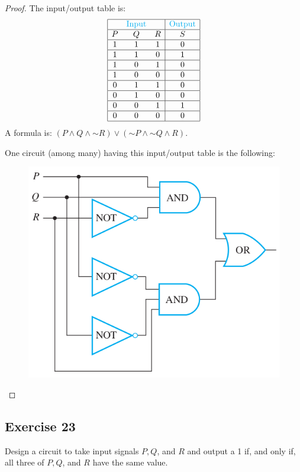 \documentclass[14pt]{extarticle}
\begin{document}
\begin{proof}
The input/output table is:
$$
\begin{array}{|ccc|c|}
\hline
& \color{cyan}\text{Input} & & \color{cyan}\text{Output} \\ \hline
P&Q&R&S\\
\hline
1&1&1&0\\
\hline
1&1&0&1\\
\hline
1&0&1&0\\
\hline
1&0&0&0\\
\hline
0&1&1&0\\
\hline
0&1&0&0\\
\hline
0&0&1&1\\
\hline
0&0&0&0\\
\hline
\end{array}
$$
A formula is: $(P \wedge Q \wedge {\sim R}) \vee ({\sim P} \wedge {\sim Q} \wedge R)$.

One circuit (among many) having this input/output table is the following:

\begin{figure}[ht!]
\centering
\includegraphics[scale=0.5]{../images/2.4.22.png}
\end{figure}
\end{proof}

\subsection{Exercise 23}
Design a circuit to take input signals $P, Q$, and $R$ and output a 1 if, and only if, all three of $P, Q$, and $R$ have the same value.
\end{document}
